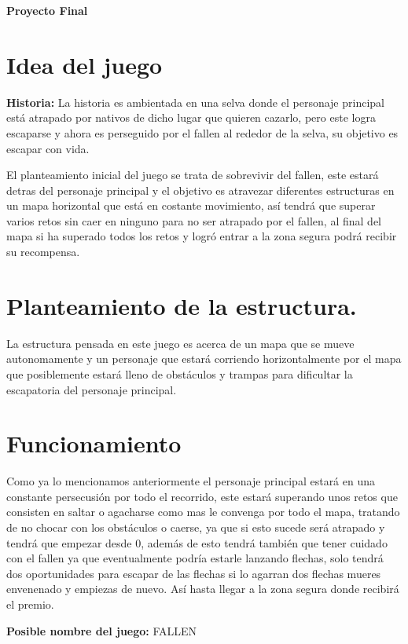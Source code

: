 \documentclass{article}
\begin{document}
\begin{titlepage}
\Huge
\textbf{Proyecto Final}

\small
\section{Idea del juego}\label{descripción}
\textbf{Historia: }
La historia es ambientada en una selva donde el personaje principal está atrapado por nativos de dicho lugar que quieren cazarlo, pero este logra escaparse y ahora es perseguido por el fallen al  rededor de la selva, su objetivo es escapar con vida. 

\vspace{0.5cm}

El planteamiento inicial del juego se trata de sobrevivir del fallen, este estará detras del personaje principal y el objetivo es atravezar diferentes estructuras en un mapa horizontal que está en costante movimiento, así tendrá que superar varios retos sin caer en ninguno para no ser atrapado por el fallen, al final del mapa si ha superado todos los retos y logró entrar a la zona segura podrá recibir su recompensa.  
\section{Planteamiento de la estructura.}\label{Planteamiento}
La estructura pensada en este juego es acerca de un mapa que se mueve autonomamente y un personaje que estará corriendo horizontalmente por el mapa que posiblemente estará lleno de obstáculos y trampas para dificultar la escapatoria del personaje principal.
\section{Funcionamiento} \label{Juego}
Como ya lo mencionamos anteriormente el personaje principal estará en una constante persecusión por todo el recorrido, este estará superando unos retos que consisten en saltar o agacharse como mas le convenga por todo el mapa, tratando de no chocar con los obstáculos o caerse, ya que si esto sucede será atrapado y tendrá que empezar desde 0, además de esto tendrá también que tener cuidado con el fallen ya que eventualmente podría estarle lanzando flechas, solo tendrá dos oportunidades para escapar de las flechas si lo agarran dos flechas mueres envenenado y empiezas de nuevo. Así hasta llegar a la zona segura donde recibirá el premio. 

\vspace{0.5cm}
\textbf{Posible nombre del juego: }
FALLEN
\vspace{0.3cm}

 \end{titlepage}   
\end{document}
